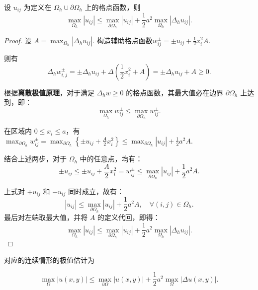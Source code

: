 \begin{theorem}[离散最大模估计]
    设 $u_{ij}$ 为定义在 $\Omega_h \cup \partial\Omega_h$ 上的格点函数，则
    \begin{equation*}
        \max_{\Omega_h} |u_{ij}| \leq \max_{\partial\Omega_h} |u_{ij}| + \frac{1}{2}a^2 \max_{\Omega_h} |\Delta_h u_{ij}|.
    \end{equation*}
\end{theorem}
\begin{proof}
    设 $A = \max_{\Omega_h} |\Delta_h u_{ij}|$. 构造辅助格点函数$w_{ij}^{\pm} = \pm u_{ij} + \frac{1}{2} x_i^2 A$.\par
    则有
    \begin{equation*}
        \Delta_h w_{i,j}^{\pm} =\pm \Delta_h u_{ij}+\Delta\left(\frac{1}{2}x_i^2+A\right) = \pm \Delta_h u_{ij} + A \geq 0.
    \end{equation*}
    
    根据\textbf{离散极值原理}，对于满足 $\Delta_h w \geq 0$ 的格点函数，其最大值必在边界 $\partial\Omega_h$ 上达到，即：
    \begin{equation*}
        \max_{\Omega_h} w_{ij}^{\pm} \leq \max_{\partial\Omega_h} w_{ij}^{\pm}.
    \end{equation*}

    在区域内 $0 \leq x_i \leq a$，有$\max_{\partial\Omega_h} w_{ij}^{\pm} = \max_{\partial\Omega_h} \left\{ \pm u_{ij} + \frac{A}{2} x_i^2 \right\} \leq \max_{\partial\Omega_h} |u_{ij}| + \frac{1}{2} a^2 A.$\par
    结合上述两步，对于 $\Omega_h$ 中的任意点，均有：
    \begin{equation*}
        \pm u_{ij} \leq \pm u_{ij} + \frac{A}{2} x_i^2 = w_{ij}^{\pm} \leq \max_{\partial\Omega_h} |u_{ij}| + \frac{1}{2} a^2 A.
    \end{equation*}

    上式对 $+u_{ij}$ 和 $-u_{ij}$ 同时成立，故有：
    \begin{equation*}
        |u_{ij}| \leq \max_{\partial\Omega_h} |u_{ij}| + \frac{1}{2} a^2 A, \quad \forall (i,j) \in \Omega_h.
    \end{equation*}
    最后对左端取最大值，并将 $A$ 的定义代回，即得：
    \begin{equation*}
        \max_{\Omega_h} |u_{ij}| \leq \max_{\partial\Omega_h} |u_{ij}| + \frac{1}{2}a^2 \max_{\Omega_h} |\Delta_h u_{ij}|.
    \end{equation*}
\end{proof}
对应的连续情形的极值估计为
\begin{theorem}[连续最大模估计]
    \[\max_{\Omega} |u(x,y)| \leq \max_{\partial\Omega} |u(x,y)| + \frac{1}{2}a^2 \max_{\Omega} |\Delta u(x,y)|.\]
\end{theorem}


